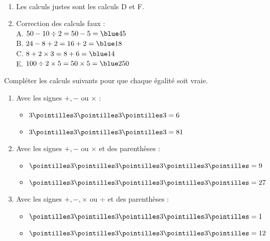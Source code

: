 \begin{colonne*exercice}
\begin{corrige}
   \ \\ [-5mm]
   \begin{enumerate}
      \item Les calculs justes sont les calculs {\blue D} et {\blue F}. \smallskip
      \item Correction des calculs faux : \\
         A. $50-10\div2 =50-5 ={\blue 45}$ \\ [1mm]
         B. $24-8+2 =16+2 ={\blue 18}$ \\ [1mm]
         C. $8+2\times3 =8+6 ={\blue 14}$ \\ [1mm]
         E. $100\div2\times5 =50\times5 = {\blue 250}$
   \end{enumerate}
\end{corrige}

\bigskip


\begin{exercice}%
   Compléter les calculs suivants pour que chaque égalité soit vraie.
   \begin{enumerate}
      \item Avec les signes $+, -$ ou $\times$ : \bigskip
      \begin{itemize}
         \item $3 \pointilles 3 \pointilles 3 \pointilles 3 = 6$ \bigskip
         \item $3 \pointilles 3 \pointilles 3 \pointilles 3 = 81$ \medskip
      \end{itemize}
      \item Avec les signes $+, -$ ou $\times$ et des parenthèses : \bigskip
      \begin{itemize}
         \item $\pointilles 3 \pointilles 3 \pointilles 3 \pointilles 3 \pointilles = 9$ \bigskip
         \item $\pointilles 3 \pointilles 3 \pointilles 3 \pointilles 3 \pointilles = 27$ \medskip
      \end{itemize}
      \item Avec les signes $+, -,\times$ ou $\div$ et des parenthèses : \bigskip
      \begin{itemize}
         \item $\pointilles 3 \pointilles 3 \pointilles 3 \pointilles 3 \pointilles = 1$ \bigskip
         \item $\pointilles 3 \pointilles 3 \pointilles 3 \pointilles 3 \pointilles = 12$
      \end{itemize}
   \end{enumerate}
\end{exercice}


\end{colonne*exercice}
